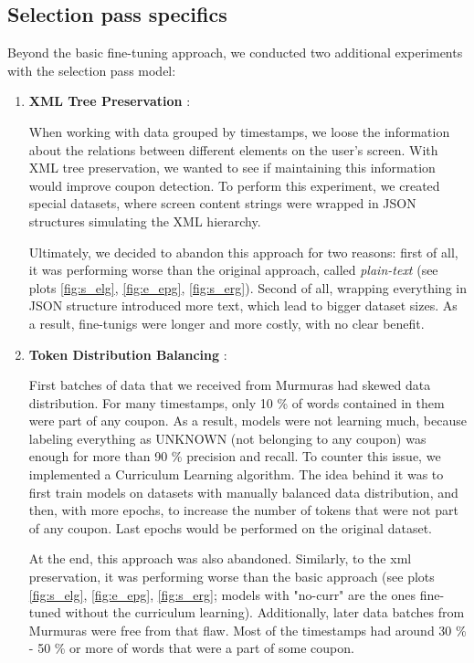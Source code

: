 \documentclass[licencjacka,en]{pracamgr}
\begin{document}
\subsection{Selection pass specifics}
Beyond the basic fine-tuning approach, we conducted two additional experiments with the selection pass model:

\begin{enumerate}
    \item \textbf{XML Tree Preservation} \cite{JSON_code}:

    When working with data grouped by timestamps, we loose the information about the relations between different elements on the user's screen. With XML tree preservation, we wanted to see if maintaining this information would improve coupon detection. To perform this experiment, we created special datasets, where screen content strings were wrapped in JSON structures simulating the XML hierarchy.

    Ultimately, we decided to abandon this approach for two reasons: first of all, it was performing worse than the original approach, called \emph{plain-text} (see plots \ref{fig:s_elg}, \ref{fig:e_epg}, \ref{fig:s_erg}). Second of all, wrapping everything in JSON structure introduced more text, which lead to bigger dataset sizes. As a result, fine-tunigs were longer and more costly, with no clear benefit.

    \item \textbf{Token Distribution Balancing} \cite{Curriculer}:

    First batches of data that we received from Murmuras had skewed data distribution. For many timestamps, only 10 \% of words contained in them were part of any coupon. As a result, models were not learning much, because labeling everything as UNKNOWN (not belonging to any coupon) was enough for more than 90 \% precision and recall. To counter this issue, we implemented a Curriculum Learning algorithm. The idea behind it was to first train models on datasets with manually balanced data distribution, and then, with more epochs, to increase the number of tokens that were not part of any coupon. Last epochs would be performed on the original dataset.

    At the end, this approach was also abandoned. Similarly, to the xml preservation, it was performing worse than the basic approach (see plots \ref{fig:s_elg}, \ref{fig:e_epg}, \ref{fig:s_erg}; models with "no-curr" are the ones fine-tuned without the curriculum learning). Additionally, later data batches from Murmuras were free from that flaw. Most of the timestamps had around 30 \% {-} 50 \% or more of words that were a part of some coupon.
\end{enumerate}
\end{document}
